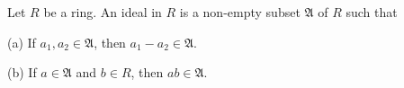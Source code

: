 Let $R$ be a ring. An ideal in $R$ is a non-empty subset $\mathfrak{A}$ of $R$ such that

(a) If $a_1, a_2 \in \mathfrak{A}$, then $a_1 - a_2 \in \mathfrak{A}$.

(b) If $a \in \mathfrak{A}$ and $b \in R$, then $ab \in \mathfrak{A}$.

